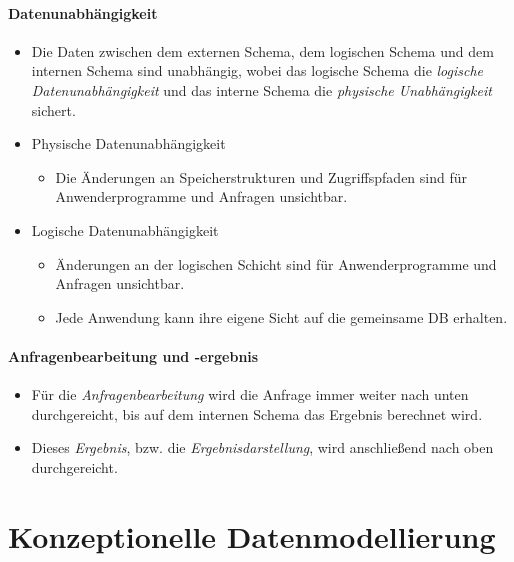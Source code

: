             \subsubsection{Datenunabhängigkeit} %
                \begin{itemize}
                	\item Die Daten zwischen dem externen Schema, dem logischen Schema und dem internen Schema sind unabhängig, wobei das logische Schema die \textit{logische Datenunabhängigkeit} und das interne Schema die \textit{physische Unabhängigkeit} sichert.
                	\item Physische Datenunabhängigkeit
                    	\begin{itemize}
                    		\item Die Änderungen an Speicherstrukturen und Zugriffspfaden sind für Anwenderprogramme und Anfragen unsichtbar.
                    	\end{itemize}
                	\item Logische Datenunabhängigkeit
                    	\begin{itemize}
                    		\item Änderungen an der logischen Schicht sind für Anwenderprogramme und Anfragen unsichtbar.
                    		\item Jede Anwendung kann ihre eigene Sicht auf die gemeinsame DB erhalten.
                    	\end{itemize}
                \end{itemize}

            \subsubsection{Anfragenbearbeitung und -ergebnis} %
                \begin{itemize}
                	\item Für die \textit{Anfragenbearbeitung} wird die Anfrage immer weiter nach unten durchgereicht, bis auf dem internen Schema das Ergebnis berechnet wird.
                	\item Dieses \textit{Ergebnis}, bzw. die \textit{Ergebnisdarstellung}, wird anschließend nach oben durchgereicht.
                \end{itemize}

\chapter{Konzeptionelle Datenmodellierung} %
    \label{c:conceptmodel}


